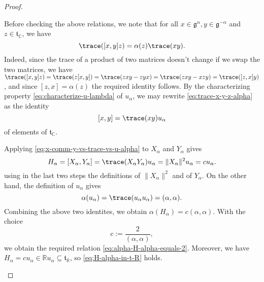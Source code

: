\documentclass[reqno]{amsart} 
\begin{document}
\begin{proof}
\begin{enumerate}
    Before checking the above relations, we note that for all $x \in \mathfrak{g}^{\alpha}, y \in \mathfrak{g}^{-\alpha}$ and $z \in \mathfrak{t}_{\mathbb{C}}$, we have
    \begin{equation}\label{eq:trace-x-y-z-alpha}
      \trace([x,y] z) = \alpha(z) \trace(x y).
    \end{equation}
    Indeed, since the trace of a product of two matrices doesn't change if we swap the two matrices, we have $\trace([x,y] z) = \trace(z[x,y]) = \trace(z x y - z y x) = \trace(z x y - x z y) = \trace([z,x] y)$, and since $[z,x] = \alpha(z)$ the required identity follows.  By the characterizing property \eqref{eq:characterize-u-lambda} of $u_\alpha$, we may rewrite \eqref{eq:trace-x-y-z-alpha} as the identity
    \begin{equation}\label{eq:x-comm-y-vs-trace-vs-u-alpha}
      [x,y] = \trace(x y) u_\alpha
    \end{equation}
    of elements of $\mathfrak{t}_{\mathbb{C}}$.

    Applying \eqref{eq:x-comm-y-vs-trace-vs-u-alpha} to $X_\alpha$ and $Y_\alpha$ gives
    \begin{equation*}
      H_\alpha = [X_\alpha, Y_\alpha ]
      = \trace(X_\alpha Y_\alpha) u_\alpha
      = \|X_\alpha \|^2 u_\alpha
      = c u_\alpha.
    \end{equation*}
    using in the last two steps the definitions of $\|X_\alpha \|^2$ and of $Y_\alpha$.  On the other hand, the definition of $u_\alpha$ gives
    \begin{equation*}
      \alpha(u_\alpha) = \trace(u_\alpha u_\alpha)
      = (\alpha,\alpha).
    \end{equation*}
    Combining the above two identites, we obtain $\alpha(H_\alpha) = c (\alpha,\alpha)$.  With the choice
    \begin{equation}\label{eq:definition-of-c-equals-2-over-alpha-alpha}
      c := \frac{2}{(\alpha,\alpha)},
    \end{equation}
    we obtain the required relation \eqref{eq:alpha-H-alpha-equals-2}.  Moreover, we have $H_\alpha = c u_\alpha \in \mathbb{R} u_\alpha \subseteq \mathfrak{t}_{\mathbb{R}}$, so \eqref{eq:H-alpha-in-t-R} holds.


\end{enumerate}
\end{proof}
\end{document}
